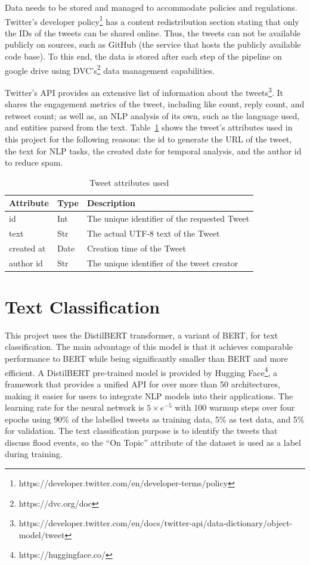 Data needs to be stored and managed to accommodate policies and regulations. Twitter's developer
policy\footnote{https://developer.twitter.com/en/developer-terms/policy} has a content
redistribution section stating that only the IDs of the tweets can be shared online. Thus, the
tweets can not be available publicly on sources, such as GitHub (the service that hosts the publicly available
code base). To this end, the data is stored after each step of the pipeline on google drive using
\ac{DVC}'s\footnote{https://dvc.org/doc} data management capabilities.


Twitter's API provides an extensive list of information about the
tweets\footnote{https://developer.twitter.com/en/docs/twitter-api/data-dictionary/object-model/tweet}.
It shares the engagement metrics of the tweet, including like count, reply count, and retweet count;
as well as, an \ac{NLP} analysis of its own, such as the language used, and entities parsed from the
text. Table~\ref{tab:tweet_attr} shows the tweet's attributes used in this project for the following reasons: the id to
generate the \ac{URL} of the tweet, the text for \ac{NLP} tasks, the created date for temporal
analysis, and the author id to reduce spam.

\begin{table}
  \center
  \begin{tabular}{|l|l|l|}
    \hline
    Attribute & Type & Description \\
    \hline
    id & Int & The unique identifier of the requested Tweet \\
    \hline
    text & Str & The actual UTF-8 text of the Tweet \\
    \hline
    created at & Date  & Creation time of the Tweet \\
    \hline
    author id & Str & The unique identifier of the tweet creator \\
    \hline
  \end{tabular}
  \caption{Tweet attributes used}
  \label{tab:tweet_attr}
\end{table}

\section{Text Classification}\label{sec:text_classification_section}

This project uses the DistilBERT transformer\cite{Sanh2019DistilBERTAD}, a variant of \ac{BERT}, for text
classification.  The main advantage of this model is that it achieves comparable performance to BERT
while being significantly smaller than BERT and more efficient. A
DistilBERT pre-trained model is provided by Hugging Face\footnote{https://huggingface.co/}, a
framework that provides a unified API for over more than 50 architectures, making it easier for
users to integrate \ac{NLP} models into their applications. The learning rate for the neural network
is $5\times e^{-5}$ with 100 warmup steps over four epochs using 90\% of the labelled tweets as
training data, 5\% as test data, and 5\% for validation. The text classification purpose is to
identify the tweets that discuss flood events, so the ``On Topic'' attribute of the dataset is used
as a label during training. 

